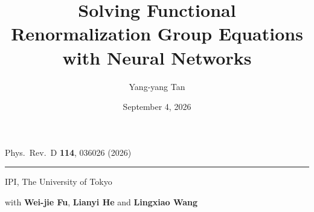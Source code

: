 \documentclass[11pt,t]{beamer}
\title{Solving Functional\\ Renormalization Group Equations\\ with Neural Networks}
\subtitle{}
\date{September 4, 2026}
\author{Yang-yang Tan}
\begin{document}
\begin{frame}
  \inserttitlegraphic\par
  \vspace*{0.5cm}
  {\LARGE\bfseries \inserttitle\par}
  \vspace{0.5em}
  {\small\color{black!65} Phys.\ Rev.\ D \textbf{114}, 036026 (2026)\par}
  \vspace{0.4em}
  {\color{orange}\rule{\textwidth}{0.4pt}\par}
  \vspace{1.4em}
  {\normalsize\bfseries \insertauthor\par}
  \vspace{0.6em}
  {\small IPI, The University of Tokyo\par}
  \vspace{0.4em}
  {\small with \textbf{Wei-jie Fu}, \textbf{Lianyi He} and \textbf{Lingxiao Wang}\par}
  \vspace{0.3em}
  {\normalsize \insertdate\par}
\end{frame}
\end{document}
